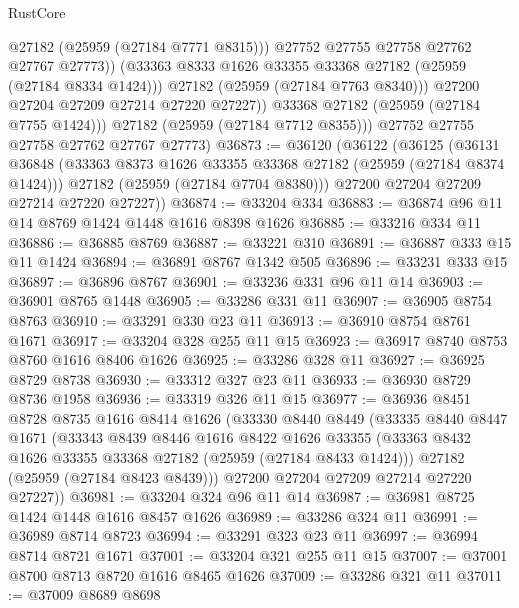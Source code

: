 \begin{lexlean}{RustCore}
\begin{coremodule}
                      @27182
                      (@25959 (@27184 @7771 @8315)))
                    @27752
                    @27755
                    @27758
                    @27762
                    @27767
                    @27773))
                (@33363 @8333 @1626 @33355 @33368 @27182 (@25959 (@27184 @8334 @1424)))
                @27182
                (@25959 (@27184 @7763 @8340)))
              @27200
              @27204
              @27209
              @27214
              @27220
              @27227))
          @33368
          @27182
          (@25959 (@27184 @7755 @1424)))
        @27182
        (@25959 (@27184 @7712 @8355)))
      @27752
      @27755
      @27758
      @27762
      @27767
      @27773)
@36873 := @36120
    (@36122
      (@36125
        (@36131
          @36848
          (@33363 @8373 @1626 @33355 @33368 @27182 (@25959 (@27184 @8374 @1424)))
          @27182
          (@25959 (@27184 @7704 @8380)))
        @27200
        @27204
        @27209
        @27214
        @27220
        @27227))
@36874 := @33204 @334
@36883 := @36874 @96 @11 @14 @8769 @1424 @1448 @1616 @8398 @1626
@36885 := @33216 @334 @11
@36886 := @36885 @8769
@36887 := @33221 @310
@36891 := @36887 @333 @15 @11 @1424
@36894 := @36891 @8767 @1342 @505
@36896 := @33231 @333 @15
@36897 := @36896 @8767
@36901 := @33236 @331 @96 @11 @14
@36903 := @36901 @8765 @1448
@36905 := @33286 @331 @11
@36907 := @36905 @8754 @8763
@36910 := @33291 @330 @23 @11
@36913 := @36910 @8754 @8761 @1671
@36917 := @33204 @328 @255 @11 @15
@36923 := @36917 @8740 @8753 @8760 @1616 @8406 @1626
@36925 := @33286 @328 @11
@36927 := @36925 @8729 @8738
@36930 := @33312 @327 @23 @11
@36933 := @36930 @8729 @8736 @1958
@36936 := @33319 @326 @11 @15
@36977 := @36936
    @8451
    @8728
    @8735
    @1616
    @8414
    @1626
    (@33330
      @8440
      @8449
      (@33335
        @8440
        @8447
        @1671
        (@33343
          @8439
          @8446
          @1616
          @8422
          @1626
          @33355
          (@33363 @8432 @1626 @33355 @33368 @27182 (@25959 (@27184 @8433 @1424)))
          @27182
          (@25959 (@27184 @8423 @8439)))
        @27200
        @27204
        @27209
        @27214
        @27220
        @27227))
@36981 := @33204 @324 @96 @11 @14
@36987 := @36981 @8725 @1424 @1448 @1616 @8457 @1626
@36989 := @33286 @324 @11
@36991 := @36989 @8714 @8723
@36994 := @33291 @323 @23 @11
@36997 := @36994 @8714 @8721 @1671
@37001 := @33204 @321 @255 @11 @15
@37007 := @37001 @8700 @8713 @8720 @1616 @8465 @1626
@37009 := @33286 @321 @11
@37011 := @37009 @8689 @8698

\end{coremodule}
\end{lexlean}
